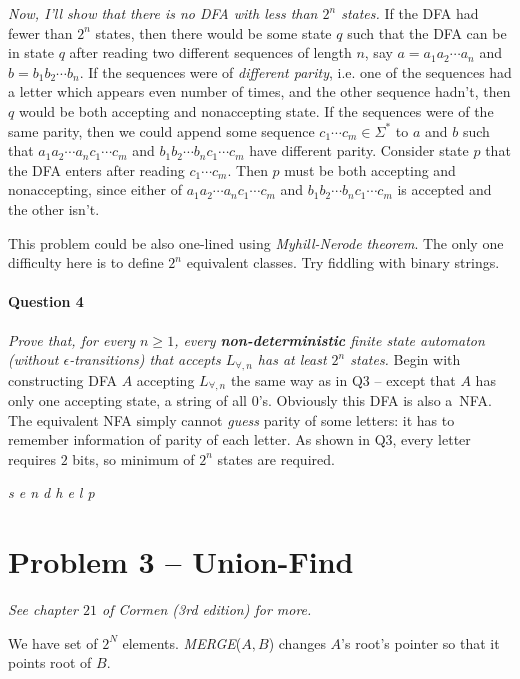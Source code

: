 \emph{Now, I'll show that there is no DFA with less than $2^n$ states.}
If the DFA had fewer than $2^n$ states, then there would be some state $q$ such that the DFA can be in state $q$ after reading two different sequences of length $n$, say $a = a_1a_2\cdots a_n$ and $b = b_1b_2\cdots b_n$.
If the sequences were of \emph{different parity}, i.e. one of the sequences had a letter which appears even number of times, and the other sequence hadn't, then $q$ would be both accepting and nonaccepting state.
If the sequences were of the same parity, then we could append some sequence $c_1\cdots c_m \in \Sigma^*$ to $a$ and $b$ such that $a_1a_2\cdots a_n c_1\cdots c_m$ and $b_1b_2\cdots b_n c_1\cdots c_m$ have different parity.
Consider state $p$ that the DFA enters after reading $c_1\cdots c_m$. 
Then $p$ must be both accepting and nonaccepting, since either of
$a_1a_2\cdots a_n c_1\cdots c_m$ and $b_1b_2\cdots b_n c_1\cdots c_m$ is accepted and the other isn't.

This problem could be also one-lined using \textit{Myhill-Nerode theorem}.
The only one difficulty here is to define $2^n$ equivalent classes.
Try fiddling with binary strings.



\paragraph{Question 4}
\emph{Prove that, for every $n\geq 1$, every \textbf{non-deterministic} finite state automaton (without $\epsilon$-transitions) that accepts $L_{\forall ,n}$ has at least $2^n$ states.}
Begin with constructing DFA $A$ accepting $L_{\forall ,n}$ the same way as in Q3 – except that $A$ has only one accepting state, a string of all $0$'s.
Obviously this DFA is also a~NFA.
The equivalent NFA simply cannot \textit{guess} parity of some letters: it has to remember information of parity of each letter.
As shown in Q3, every letter requires $2$ bits, so minimum of $2^n$ states are required.

\emph{s e n d h e l p}




\section{Problem 3 – Union-Find}
\emph{See chapter $21$ of Cormen (3rd edition) for more.}

We have set of $2^N$ elements. 
\emph{MERGE}($A, B$) changes $A$'s root's pointer so that it points root of $B$.

